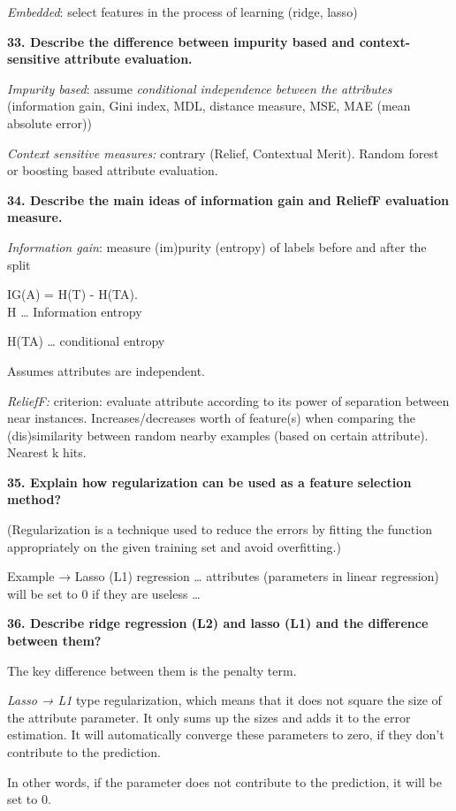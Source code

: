 \textit{Embedded}: select features in the process of learning (ridge,
lasso)

\textbf{33. Describe the difference between impurity based and
context-sensitive attribute evaluation.}

\textit{Impurity based}: assume \emph{conditional independence
between the attributes} (information gain, Gini index, MDL, distance
measure, MSE, MAE (mean absolute error))

\textit{Context sensitive measures:} contrary (Relief, Contextual
Merit). Random forest or boosting based attribute evaluation.

\textbf{34. Describe the main ideas of information gain and ReliefF
evaluation measure.}

\textit{Information gain}: measure (im)purity (entropy) of labels
before and after the split

IG(A) = H(T) - H(T\textbar A).\\
H \ldots{} Information entropy

H(T\textbar A) \ldots{} conditional entropy

Assumes attributes are independent.

\textit{ReliefF:} criterion: evaluate attribute according to its
power of separation between near instances. Increases/decreases worth of
feature(s) when comparing the (dis)similarity between random nearby
examples (based on certain attribute). Nearest k hits.

\textbf{35. Explain how regularization can be used as a feature
selection method?}

(Regularization is a technique used to reduce the errors by fitting the
function appropriately on the given training set and avoid overfitting.)

Example → Lasso (L1) regression \ldots{} attributes (parameters in
linear regression) will be set to 0 if they are useless \ldots{}

\textbf{36. Describe ridge regression (L2) and lasso (L1) and the
difference between them?}

The key difference between them is the penalty term.

\textit{Lasso → L1} type regularization, which means that it does not
square the size of the attribute parameter. It only sums up the sizes
and adds it to the error estimation. It will automatically converge
these parameters to zero, if they don't contribute to the prediction.

In other words, if the parameter does not contribute to the prediction,
it will be set to 0.

